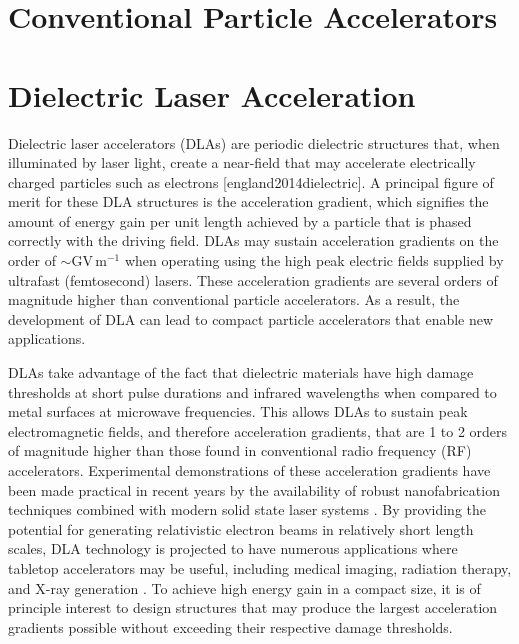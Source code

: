 \usepackage{suthesis-2e}

\section{Conventional Particle Accelerators}

\section{Dielectric Laser Acceleration}

Dielectric laser accelerators (DLAs) are periodic dielectric structures that, when illuminated by laser light, create a near-field that may accelerate electrically charged particles such as electrons [england2014dielectric].
A principal figure of merit for these DLA structures is the acceleration gradient, which signifies the amount of energy gain per unit length achieved by a particle that is phased correctly with the driving field. 
DLAs may sustain acceleration gradients on the order of ${\sim}\textrm{GV}\,\textrm{m}^{-1}$ when operating using the high peak electric fields supplied by ultrafast (femtosecond) lasers.
These acceleration gradients are several orders of magnitude higher than conventional particle accelerators.
As a result, the development of DLA can lead to compact particle accelerators that enable new applications.

DLAs take advantage of the fact that dielectric materials have high damage thresholds at short pulse durations and infrared wavelengths \cite{england2014dielectric, mcneur2016elements, soong2012laser} when compared to metal surfaces at microwave frequencies.
This allows DLAs to sustain peak electromagnetic fields, and therefore acceleration gradients, that are 1 to 2 orders of magnitude higher than those found in conventional radio frequency (RF) accelerators.
Experimental demonstrations of these acceleration gradients have been made practical in recent years by the availability of robust nanofabrication techniques combined with modern solid state laser systems \cite{dawson2008analysis}.
By providing the potential for generating relativistic electron beams in relatively short length scales, DLA technology is projected to have numerous applications where tabletop accelerators may be useful, including medical imaging, radiation therapy, and X-ray generation \cite{plettner2008microstructure,england2014dielectric}.
To achieve high energy gain in a compact size, it is of principle interest to design structures that may produce the largest acceleration gradients possible without exceeding their respective damage thresholds.

